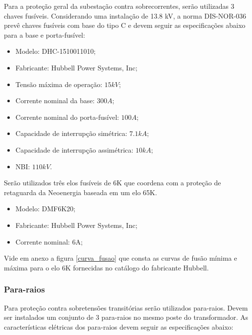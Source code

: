 Para a proteção geral da subestação contra sobrecorrentes, serão utilizadas 3 chaves fusíveis. Considerando uma instalação de 13.8 kV, a norma DIS-NOR-036 prevê chaves fusíveis com base do tipo C e devem seguir as especificações abaixo para a base e porta-fusível:

\begin{itemize}
    \item Modelo: DHC-1510011010;
    \item Fabricante: Hubbell Power Systems, Inc;
    \item Tensão máxima de operação: $15 kV$;
    \item Corrente nominal da base: $300 A$; 
    \item Corrente nominal do porta-fusível: $100 A$;
    \item Capacidade de interrupção simétrica: $7.1 kA$;
    \item Capacidade de interrupção assimétrica: $10 kA$;
    \item NBI: $110 kV$.
\end{itemize}

Serão utilizados três elos fusíveis de 6K que coordena com a proteção de retaguarda da Neoenergia baseada em um elo 65K.

\begin{itemize}
    \item Modelo: DMF6K20;
    \item Fabricante: Hubbell Power Systems, Inc;
    \item Corrente nominal: 6A;
\end{itemize}

Vide em anexo a figura \ref{curva_fusao} que consta as curvas de fusão mínima e máxima para o elo 6K fornecidas no catálogo do fabricante Hubbell.

\subsubsection{Para-raios}

Para proteção contra sobretensões transitórias serão utilizados para-raios. Devem ser instalados um conjunto de 3 para-raios no mesmo poste do transformador. As características elétricas dos para-raios devem seguir as especificações abaixo:

